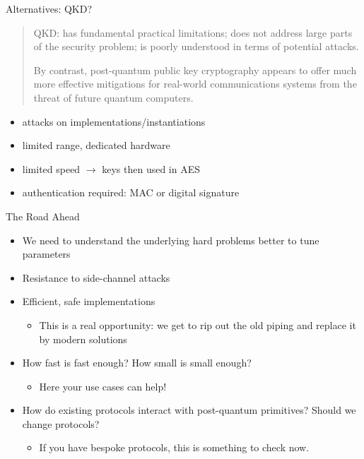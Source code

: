 \documentclass[xcolor=table,10pt,aspectratio=169]{beamer}
\begin{document}
\begin{frame}[label={sec:org33d1073}]{Alternatives: QKD?}
\begin{quote}
QKD: has fundamental practical limitations; does not address large parts of the security problem; is poorly understood in terms of potential attacks.

By contrast, post-quantum public key cryptography appears to offer much more effective mitigations for real-world communications systems from the threat of future quantum computers.
\end{quote}

\begin{itemize}
\item attacks on implementations/instantiations
\item limited range, dedicated hardware
\item limited speed \(\rightarrow\) keys then used in AES
\item authentication required: MAC or digital signature
\end{itemize}
\end{frame}

\begin{frame}[label={sec:orgd904145}]{The Road Ahead}
\begin{itemize}
\item We need to understand the underlying hard problems better to tune parameters
\item Resistance to side-channel attacks
\item Efficient, safe implementations
\begin{itemize}
\item This is a real opportunity: we get to rip out the old piping and replace it by modern solutions 
\end{itemize}
\item How fast is fast enough? How small is small enough?
\begin{itemize}
\item Here your use cases can help!
\end{itemize}
\item How do existing protocols interact with post-quantum primitives? Should we change protocols?
\begin{itemize}
\item If you have bespoke protocols, this is something to check now.
\end{itemize}
\end{itemize}
\end{frame}
\end{document}
